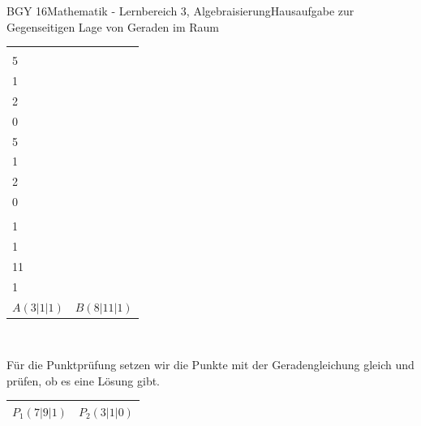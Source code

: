 \documentclass[oneside,openany,headings=optiontotoc,11pt,numbers=noenddot]{scrreprt}
\begin{document}
\begin{worksheet}{BGY 16}{Mathematik - Lernbereich 3, Algebraisierung}{Hausaufgabe zur Gegenseitigen Lage von Geraden im Raum}
\begin{framed}
\begin{tabularx}{\textwidth}{X|X}
				\hline
				\(\vec{x} = \left(\begin{array}{c}5\\5\\1\end{array}\right) + (-2)*\left(\begin{array}{c}1\\2\\0\end{array}\right)\) & \(\vec{x} = \left(\begin{array}{c}5\\5\\1\end{array}\right) + 3*\left(\begin{array}{c}1\\2\\0\end{array}\right)\)\\
				\(\vec{x} = \left(\begin{array}{c}3\\1\\1\end{array}\right)\) & \(\vec{x} = \left(\begin{array}{c}8\\11\\1\end{array}\right)\)\\
				\underline{\(A(3|1|1)\)} & \underline{\(B(8|11|1)\)}
			\end{tabularx}\\
			\par\bigskip\noindent
			Für die Punktprüfung setzen wir die Punkte mit der Geradengleichung gleich und prüfen, ob es eine Lösung gibt.\\
			\begin{tabularx}{\textwidth}{X|X}
				\(P_1(7|9|1)\) & \(P_2(3|1|0)\)\\
				\hline

\end{tabularx}
\end{framed}
\end{worksheet}
\end{document}
